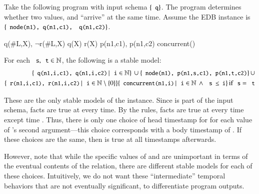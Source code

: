 \begin{example}
\label{ex:unimportant}
Take the following \lang program with input schema $\{\dedalus{q}\}$.  The program determines whether two values,  and  ``arrive'' at the same time.  Assume the EDB instance is $\{\dedalus{node(n1), q(n1,c1),}$ $\dedalus{q(n1,c2)}\}$.

\begin{Drules}
        {q(#L,X), $\lnot$r(#L,X)}
        {q(X)}
        {r(X)}
        {p(n1,c1), p(n1,c2)}
        {concurrent()}
\end{Drules}

For each $\dedalus{s}, \dedalus{t} \in \mathbb{N}$, the following is a stable model:
\begin{eqnarray*}
\{\dedalus{q(n1,i,c1), q(n1,i,c2)} \, | \, \dedalus{i} \in \mathbb{N}\} \, \cup
\{\dedalus{node(n1), p(n1,s,c1), p(n1,t,c2)}\} \, \cup \\
\{\dedalus{r(n1,i,c1), r(n1,i,c2)} \, | \, \dedalus{i} \in \mathbb{N} \setminus \{0\}\}
\{\dedalus{concurrent(n1,i)} \, | \, \dedalus{i} \in \mathbb{N} \, \land \, \dedalus{s $\leq$ i}\} \, \text{if} \, \dedalus{s} = \dedalus{t}
\end{eqnarray*}

These are the only stable models of the instance. Since  is part of the input schema,  facts are true at every time.  By the rules,  facts are true at every time except time .  Thus, there is only one choice of head timestamp for  for each value of 's second argument---this choice corresponds with a body timestamp of .  If these choices are the same, then  is true at all timestamps afterwards.

However, note that while the specific values of  and  are unimportant in terms of the eventual contents of the  relation, there are different stable models for each of these choices.  Intuitively, we do not want these ``intermediate'' temporal behaviors that are not eventually significant, to differentiate program outputs.
\end{example}

